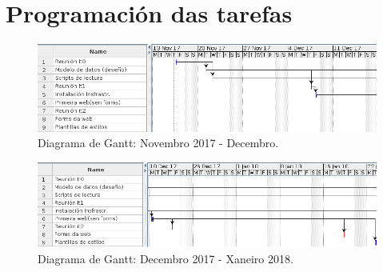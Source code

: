 \section{Programación das tarefas}


\begin{figure}[H]
	\centering
	\includegraphics[scale=0.55,keepaspectratio=true]{./images/gantt/gantt1-1.png}
	\caption{Diagrama de Gantt: Novembro 2017 - Decembro.}
	\label{fig:gantt1-1}
\end{figure}

\begin{figure}[H]
	\centering
	\includegraphics[scale=0.5,keepaspectratio=true]{./images/gantt/gantt1-2.png}
	\caption{Diagrama de Gantt: Decembro 2017 - Xaneiro 2018.}
	\label{fig:gantt1-2}
\end{figure}

